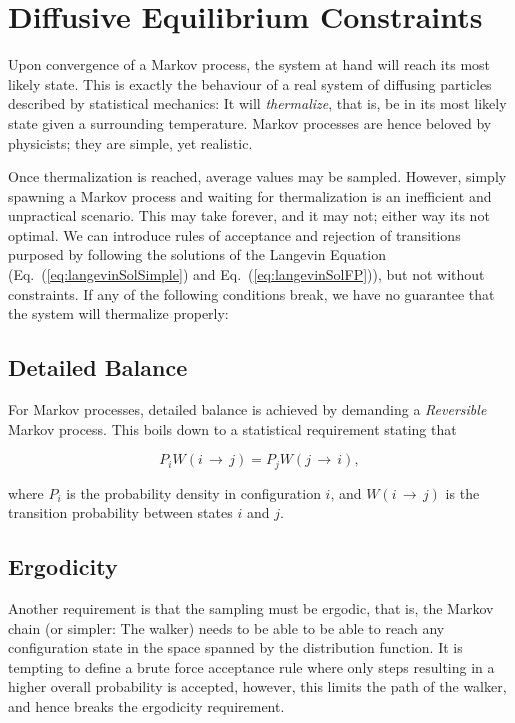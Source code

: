 \section{Diffusive Equilibrium Constraints}

Upon convergence of a Markov process, the system at hand will reach its most likely state. This is exactly the behaviour of a real system of diffusing particles described by statistical mechanics: It will \textit{thermalize}, that is, be in its most likely state given a surrounding temperature. Markov processes are hence beloved by physicists; they are simple, yet realistic. 

Once thermalization is reached, average values may be sampled. However, simply spawning a Markov process and waiting for thermalization is an inefficient and unpractical scenario. This may take forever, and it may not; either way its not optimal. We can introduce rules of acceptance and rejection of transitions purposed by following the solutions of the Langevin Equation (Eq.~(\ref{eq:langevinSolSimple}) and Eq.~(\ref{eq:langevinSolFP})), but not without constraints. If any of the following conditions break, we have no guarantee that the system will thermalize properly:

\subsection{Detailed Balance} 

For Markov processes, detailed balance is achieved by demanding a \textit{Reversible} Markov process. This boils down to a statistical requirement stating that 

\begin{equation}
 \label{eq:DetailedBalance}
 P_iW(i\,\rightarrow\,j) = P_jW(j\,\rightarrow\,i),
\end{equation}

where $P_i$ is the probability density in configuration $i$, and $W(i\,\rightarrow\,j)$ is the transition probability between states $i$ and $j$. 

\subsection{Ergodicity}

Another requirement is that the sampling must be ergodic, that is, the Markov chain (or simpler: The walker) needs to be able to be able to reach any configuration state in the space spanned by the distribution function. It is tempting to define a brute force acceptance rule where only steps resulting in a higher overall probability is accepted, however, this limits the path of the walker, and hence breaks the ergodicity requirement.


